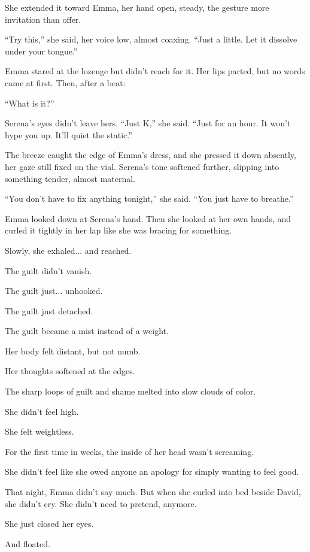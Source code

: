 She extended it toward Emma, her hand open, steady, the gesture more invitation than offer.

``Try this,'' she said, her voice low, almost coaxing. ``Just a little. Let it dissolve under your tongue.''

Emma stared at the lozenge but didn’t reach for it. Her lips parted, but no words came at first. Then, 
after a beat:

``What is it?''

Serena’s eyes didn’t leave hers. ``Just K,'' she said. ``Just for an hour. It won’t hype you up. It’ll 
quiet the static.''

The breeze caught the edge of Emma’s dress, and she pressed it down absently, her gaze still fixed 
on the vial. Serena’s tone softened further, slipping into something tender, almost maternal.

``You don’t have to fix anything tonight,'' she said. ``You just have to breathe.''

Emma looked down at Serena’s hand. Then she looked at 
her own hands, and curled it tightly in her lap like she was bracing for something. 

Slowly, she exhaled...  and reached.

The guilt didn’t vanish. 

The guilt just... unhooked. 

The guilt just detached. 

The guilt became a mist instead of a weight. 

Her body felt distant, but not numb. 

Her thoughts softened at the edges. 

The sharp loops of guilt and shame melted into slow clouds of color.

She didn’t feel high.

She felt weightless.

For the first time in weeks, the inside of her head wasn’t screaming.

She didn’t feel like she owed anyone an apology for simply wanting to feel good.

That night, Emma didn’t say much. But when she curled into bed beside David, she didn’t cry.
She didn’t need to pretend, anymore.

She just closed her eyes.

And floated.

